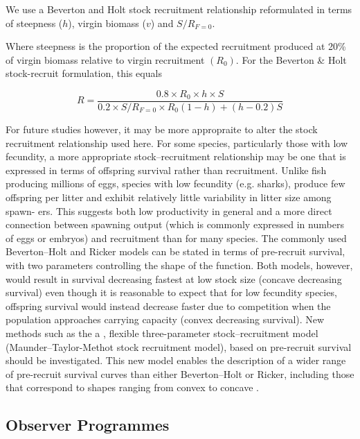 \documentclass[preprint,authoryear,12pt]{elsarticle}
\begin{document}
We use a Beverton and Holt stock recruitment relationship reformulated in terms of steepness ($h$), virgin biomass ($v$) and $S/R_{F=0}$. 
 
Where steepness is the proportion of the expected recruitment produced at 20\% of virgin biomass relative to virgin recruitment $(R_0)$. For the Beverton \& Holt  
stock-recruit formulation, this equals 
 
\begin{equation} 
R=\frac{0.8 \times R_0 \times h \times S}{0.2 \times S/R_{F=0} \times R_0(1-h)+(h-0.2)S} 
\end{equation}  
 
For future studies however, it may be more appropraite to alter the stock recruitment relationship used here. For some species, 
particularly those with low  
fecundity, a more appropriate stock–recruitment relationship may  
be one that is expressed in terms of offspring survival rather 
than recruitment. Unlike fish producing millions of eggs, species 
with low fecundity (e.g. sharks), produce few offspring per litter  
and exhibit relatively little variability in litter size among spawn-  
ers. This suggests both low productivity in general and a more  
direct connection between spawning output (which is commonly 
expressed in numbers of eggs or embryos) and recruitment than  
for many species. The commonly used Beverton–Holt and Ricker 
models can be stated in terms of pre-recruit survival, with two  
parameters controlling the shape of the function. Both models, however, would result in survival decreasing fastest at low stock 
size (concave decreasing survival) even though it is  reasonable 
to expect that for low fecundity species, offspring survival would 
instead decrease faster due to competition when the population 
approaches carrying capacity (convex decreasing survival). New methods such as the a , flexible three-parameter 
stock–recruitment model (Maunder–Taylor-Methot stock recruitment 
model), based on pre-recruit survival should be investigated. This new model enables 
the description of a wider range of pre-recruit survival curves than 
either Beverton–Holt or Ricker, including those that correspond to 
shapes ranging from convex to concave \citet{taylor2012srr}. 

\subsection{Observer Programmes}
\end{document}
